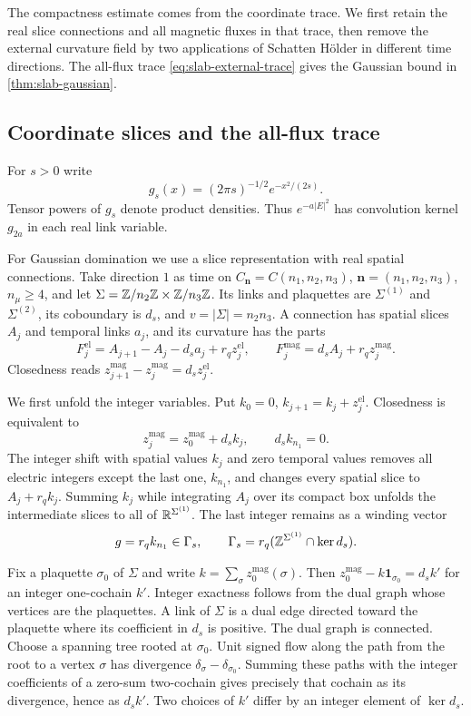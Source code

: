 The compactness estimate comes from the coordinate trace. We first
retain the real slice connections and all magnetic fluxes in that
trace, then remove the external curvature field by two applications
of Schatten H\"older in different time directions. The all-flux trace
\eqref{eq:slab-external-trace} gives the Gaussian bound in
\cref{thm:slab-gaussian}.

\subsection{Coordinate slices and the all-flux trace}\label{subsec:slab-coordinate-trace}

For $s>0$ write
\[
 g_s(x)=(2\pi s)^{-1/2}e^{-x^2/(2s)}.
\]
Tensor powers of $g_s$ denote product densities. Thus $e^{-a|E|^2}$
has convolution kernel $g_{2a}$ in each real link variable.

For Gaussian domination we use a slice representation with real
spatial connections. Take direction $1$ as time on
$C_{\mathbf n}=C(n_1,n_2,n_3)$, $\mathbf n=(n_1,n_2,n_3)$,
$n_\mu\ge4$, and let
$\Sigma=\mathbb Z/n_2\mathbb Z\times\mathbb Z/n_3\mathbb Z$. Its links and plaquettes are
$\Sigma^{(1)}$ and $\Sigma^{(2)}$, its coboundary is $d_s$, and
$v=|\Sigma|=n_2n_3$. A connection has spatial slices $A_j$ and
temporal links $a_j$, and its curvature has the parts
\begin{equation}\label{eq:slab-slice-curvatures}
 F_j^{\mathrm{el}}=A_{j+1}-A_j-d_sa_j+r_qz_j^{\mathrm{el}},
 \qquad F_j^{\mathrm{mag}}=d_sA_j+r_qz_j^{\mathrm{mag}}.
\end{equation}
Closedness reads
$z_{j+1}^{\mathrm{mag}}-z_j^{\mathrm{mag}}=d_sz_j^{\mathrm{el}}$.

We first unfold the integer variables. Put
$k_0=0$, $k_{j+1}=k_j+z_j^{\mathrm{el}}$. Closedness is equivalent to
\[
 z_j^{\mathrm{mag}}=z_0^{\mathrm{mag}}+d_sk_j,
                       \qquad d_sk_{n_1}=0.
\]
The integer shift with spatial values $k_j$ and zero temporal values
removes all electric integers except the last one, $k_{n_1}$, and
changes every spatial slice to $A_j+r_qk_j$. Summing $k_j$ while
integrating $A_j$ over its compact box unfolds the intermediate
slices to all of $\mathbb R^{\Sigma^{(1)}}$. The last integer remains as a
winding vector
\[
 g=r_qk_{n_1}\in\Gamma_s,
 \qquad\Gamma_s=r_q(\mathbb Z^{\Sigma^{(1)}}\cap\ker d_s).
\]

Fix a plaquette $\sigma_0$ of $\Sigma$ and write
$k=\sum_\sigma z_0^{\mathrm{mag}}(\sigma)$. Then
$z_0^{\mathrm{mag}}-k\mathbf1_{\sigma_0}=d_sk'$ for an integer
one-cochain $k'$. Integer exactness follows from the dual graph whose
vertices are the plaquettes. A link of
$\Sigma$ is a dual edge directed toward the plaquette where its
coefficient in $d_s$ is positive. The dual graph is connected. Choose a spanning tree rooted at
$\sigma_0$. Unit signed flow along the path from the
root to a vertex $\sigma$ has divergence
$\delta_\sigma-\delta_{\sigma_0}$. Summing these paths with the
integer coefficients of a zero-sum two-cochain gives precisely that
cochain as its divergence, hence as $d_sk'$. Two choices of $k'$
differ by an integer element of $\ker d_s$.

